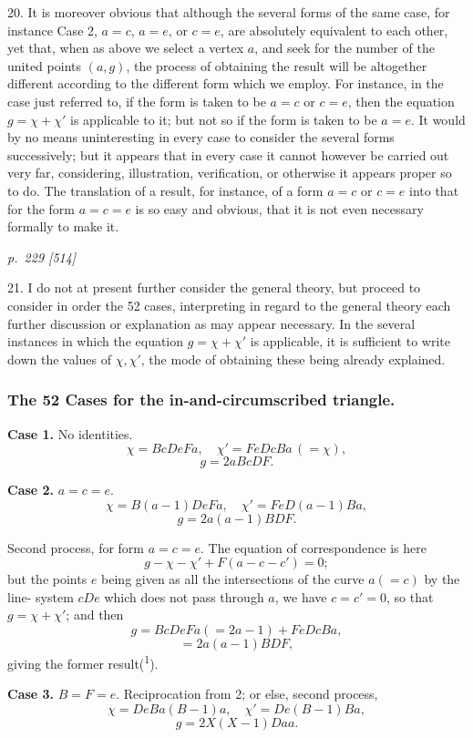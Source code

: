 \documentclass[11pt,a4paper]{book}
\begin{document}
20. It is moreover obvious that although the several forms of the same case, for
instance Case 2, $a=c$, $a=e$, or $c=e$, are absolutely equivalent to each other, yet that,
when as above we select a vertex $a$, and seek for the number of the united points
$(a, g)$, the process of obtaining the result will be altogether different according to the
different form which we employ.  For instance, in the case just referred to, if the
form is taken to be $a=c$ or $c=e$, then the equation $g=\chi+\chi'$ is applicable to it;
but not so if the form is taken to be $a=e$.  It would by no means uninteresting
in every case to consider the several forms successively; but it appears that in
every case it cannot however be carried out very far, considering, illustration, verification, or otherwise it appears
proper so to do.  The translation of a result, for instance, of a form $a=c$ or $c=e$
into that for the form $a=c=e$ is so easy and obvious, that it is not even necessary
formally to make it.

\clearpage

\bigskip
\textit{p.~229 [514]}
\smallskip

21. I do not at present further consider the general theory, but proceed to consider
in order the 52 cases, interpreting in regard to the general theory each further
discussion or explanation as may appear necessary.  In the several instances in which
the equation $g=\chi+\chi'$ is applicable, it is sufficient to write down the values of $\chi, \chi'$,
the mode of obtaining these being already explained.

\subsubsection*{The 52 Cases for the in-and-circumscribed triangle.}

\textbf{Case 1.}  No identities.
\[
\chi=BcDeFa, \quad \chi'=FeDcBa\,(=\chi),
\]
\[
g=2aBcDF.
\]

\textbf{Case 2.}  $a=c=e$.
\[
\chi=B(a-1)DeFa, \quad \chi'=FeD(a-1)Ba,
\]
\[
g=2a(a-1)BDF.
\]

Second process, for form $a=c=e$.  The equation of correspondence is here
\[
g-\chi-\chi'+F(a-c-c')=0;
\]
but the points $e$ being given as all the intersections of the curve $a(=c)$ by the line-
system $cDe$ which does not pass through $a$, we have $c=c'=0$, so that $g=\chi+\chi'$;
and then
\[
g=BcDeFa(=2a-1)+FeDcBa,
\]
\[
=2a(a-1)BDF,
\]
giving the former result(\textsuperscript{1}).

\textbf{Case 3.}  $B=F=e$.  Reciprocation from 2; or else, second process,
\[
\chi=DeBa(B-1)a, \quad \chi'=De(B-1)Ba,
\]
\[
g=2X(X-1)Daa.
\]
\end{document}
